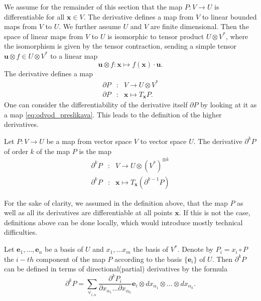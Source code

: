 \documentclass[smallcondensed]{svjour3}
\newcommand{\e}{\mathbf{e}}
\newcommand{\x}{\mathbf{x}}
\newcommand{\uu}{\mathbf{u}}
\newcommand{\D}{\partial}
\begin{document}
We assume for the remainder of this section that the map $P:V\to U$ is
differentiable for all $\x\in V$. The derivative defines a map from $V$ to
linear bounded maps from $V$ to $U$. We further assume $U$ and $V$ are finite
dimensional. Then the space of linear maps from $V$ to $U$ is isomorphic to
tensor product $U\otimes V^*$, where the isomorphism is given by the
tensor contraction, sending a simple tensor $\uu\otimes f\in U\otimes
V^*$ to a linear map
 \begin{equation}
   \label{eq:lin_tenzor}
   \uu\otimes f:\x \mapsto f(\x)\cdot \uu.
 \end{equation}
The derivative defines a map
\begin{eqnarray}
  \label{eq:odvod_preslikava}
  \D P&:& V\to U\otimes V^*\\
  \D P&:& \x \mapsto T_\x P.
\end{eqnarray}
One can consider the differentiability of the derivative itself $\D P$ by
looking at it as a map \eqref{eq:odvod_preslikava}. This leads to the definition
of the higher derivatives.
\begin{definition}
  \label{def:higher_derivatives}
  Let $P:V\to U$ be a map from vector space $V$ to vector space $U$. 
The derivative $\D^k P$ of order $k$ of the map $P$ is the map
\begin{eqnarray}\label{eq:partial}
    \label{eq:visji_odvod}
    \D^kP&:&V\to U\otimes (V^*)^{\otimes k}\\
    \D^kP&:&\x\mapsto T_\x\left( \D^{k-1}P \right)
  \end{eqnarray}
\end{definition} 
\begin{remark}
  For the sake of clarity, we assumed in the definition above, that the map $P$
  as well as all its derivatives are differentiable at all points $\x$. If this
  is not the case, 
  definitions above can be done locally, which would introduce mostly technical
  difficulties. 
\end{remark}
Let $\e_1,\ldots,\e_n$ be a basis of $U$ and $x_1,\ldots x_m$ the basis of
$V^*$. Denote by $P_i=x_i\circ P$ the $i-th$ component of the map
$P$ according to the basis $\{\e_i\}$ of $U$.
Then $\D^kP$  can be defined in terms of
directional(partial) derivatives by the formula
\begin{equation}\label{eq:d}
	\partial^kP=\sum_{\forall_{i,\alpha}}\frac{\partial^k P_i}{\partial
	    x_{\alpha_1}\ldots \partial x_{\alpha_k}}\e_i\otimes
	  dx_{\alpha_1}\otimes\ldots \otimes dx_{\alpha_k}.
\end{equation}
\end{document}
